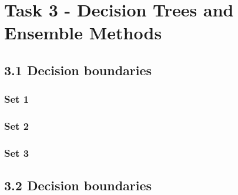 \section{Task 3 - Decision Trees and Ensemble Methods}



\subsection*{3.1 Decision boundaries}

\subsubsection*{Set 1}

	

	
\subsubsection*{Set 2}



	
	
\subsubsection*{Set 3}






\subsection*{3.2 Decision boundaries}

	
